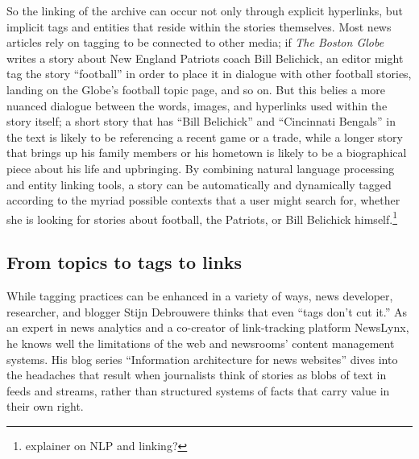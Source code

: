 So the linking of the archive can occur not only through explicit hyperlinks, but implicit tags and entities that reside within the stories themselves. Most news articles rely on tagging to be connected to other media; if \emph{The Boston Globe} writes a story about New England Patriots coach Bill Belichick, an editor might tag the story ``football'' in order to place it in dialogue with other football stories, landing on the Globe's football topic page, and so on. But this belies a more nuanced dialogue between the words, images, and hyperlinks used within the story itself; a short story that has ``Bill Belichick'' and ``Cincinnati Bengals'' in the text is likely to be referencing a recent game or a trade, while a longer story that brings up his family members or his hometown is likely to be a biographical piece about his life and upbringing. By combining natural language processing and entity linking tools, a story can be automatically and dynamically tagged according to the myriad possible contexts that a user might search for, whether she is looking for stories about football, the Patriots, or Bill Belichick himself.\footnote{explainer on NLP and linking?}

\subsection{From topics to tags to links}

While tagging practices can be enhanced in a variety of ways, news developer, researcher, and blogger Stijn Debrouwere thinks that even ``tags don't cut it.''\autocite{debrouwere_tags_2010} As an expert in news analytics and a co-creator of link-tracking platform NewsLynx, he knows well the limitations of the web and newsrooms' content management systems. His blog series ``Information architecture for news websites'' dives into the headaches that result when journalists think of stories as blobs of text in feeds and streams, rather than structured systems of facts that carry value in their own right.\autocite{debrouwere_information_2010}

